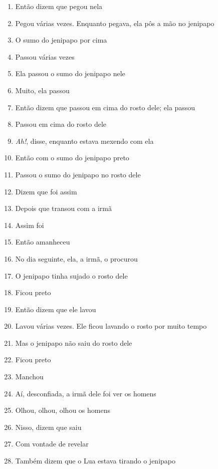 \begin{enumerate}
\item Então dizem que pegou nela
\item Pegou várias vezes. Enquanto pegava, ela pôs a mão no jenipapo
\item O sumo do jenipapo por cima
\item Passou várias vezes
\item Ela passou o sumo do jenipapo nele
\item Muito, ela passou
\item Então dizem que passou em cima do rosto dele; ela passou
\item Passou em cima do rosto dele
\item \textit{Ah!}, disse, enquanto estava mexendo com ela
\item Então com o sumo do jenipapo preto
\item Passou o sumo do jenipapo no rosto dele
\item Dizem que foi assim
\item Depois que transou com a irmã
\item Assim foi

\begin{center}\end{center}

\item Então amanheceu
\item No dia seguinte, ela, a irmã, o procurou
\item O jenipapo tinha sujado o rosto dele
\item Ficou preto
\item Então dizem que ele lavou
\item Lavou várias vezes. Ele ficou lavando o rosto por muito tempo
\item Mas o jenipapo não saiu do rosto dele
\item Ficou preto
\item Manchou

\begin{center}\end{center}

\item Aí, desconfiada, a irmã dele foi ver os homens
\item Olhou, olhou, olhou os homens
\item Nisso, dizem que saiu
\item Com vontade de revelar
\item Também dizem que o Lua estava tirando o jenipapo


\end{enumerate}
